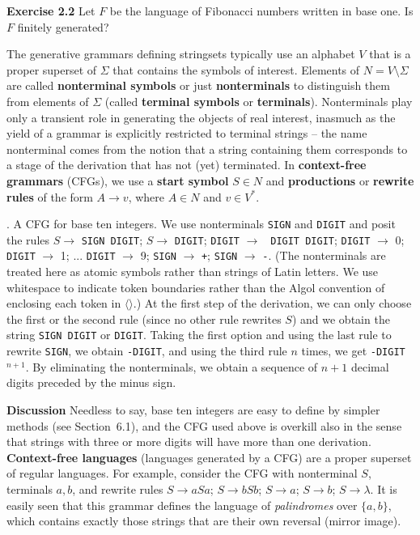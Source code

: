 {\smallskip\noindent 
{\bf Exercise 2.2} Let $F$ be the language of Fibonacci numbers written in base
one. Is $F$ finitely generated? 

\medskip\noindent
The generative grammars defining stringsets typically use an alphabet $V$
that is a proper superset of $\Sigma$ that contains the symbols of interest.
Elements of $N = V \setminus \Sigma$ are called {\bf nonterminal symbols} or
just {\bf nonterminals} to distinguish them from elements of $\Sigma$ (called
{\bf terminal symbols} or {\bf terminals}). Nonterminals play only a transient
role in generating the objects of real interest, inasmuch as the yield of a
grammar is explicitly restricted to terminal strings -- the name nonterminal
comes from the notion that a string containing them corresponds to a stage of
the derivation that has not (yet) terminated.  In {\bf context-free grammars}
(CFGs), we use a {\bf start symbol} $S \in N$ and {\bf productions} or {\bf
rewrite rules} of the form $A \rightarrow v$, where $A \in N$ and $v \in V^*$.

\smallskip{}. A CFG for base ten integers. We use
nonterminals {\tt SIGN} and {\tt DIGIT} and posit the rules $S \rightarrow$
{\tt SIGN DIGIT}; $S \rightarrow$ {\tt DIGIT}; {\tt DIGIT} $\rightarrow$ {\tt
  DIGIT DIGIT}; {\tt DIGIT} $\rightarrow$ 0; {\tt DIGIT} $\rightarrow$ 1; ...
{\tt DIGIT} $\rightarrow$ 9; {\tt SIGN} $\rightarrow$ {\tt +}; {\tt SIGN}
$\rightarrow$ {\tt -}. (The nonterminals are treated here as atomic symbols
rather than strings of Latin letters. We use whitespace to indicate token
boundaries rather than the Algol convention of enclosing each token in
$\langle \rangle$.) At the first step of the derivation, we can only choose the
first or the second rule (since no other rule rewrites $S$) and we obtain the
string {\tt SIGN DIGIT} or {\tt DIGIT}.  Taking the first option and using
the last rule to rewrite {\tt SIGN}, we obtain {\tt -DIGIT}, and using the
third rule $n$ times, we get {\tt -DIGIT}$^{n+1}$. By eliminating the
nonterminals, we obtain a sequence of $n+1$ decimal digits preceded by the
minus sign.

\smallskip\noindent
{\bf Discussion} Needless to say, base ten integers are easy to define by
simpler methods (see Section~6.1), and the CFG used above is overkill also in
the sense that strings with three or more digits will have more than one
derivation. {\bf Context-free languages} (languages generated by a CFG) are a
proper superset of regular languages. For example, consider the CFG with
nonterminal $S$, terminals $a,b$, and rewrite rules $S \rightarrow aSa$; $S
\rightarrow bSb$; $S \rightarrow a$; $S \rightarrow b$; $S \rightarrow
\lambda$. It is easily seen that this grammar defines the language of {\it
palindromes} over $\{a,b\}$, which contains exactly those strings that are
their own reversal (mirror image). 

}

